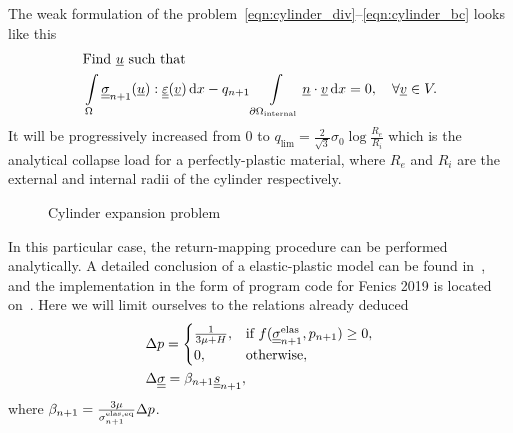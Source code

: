 \documentclass[12pt]{article}
\begin{document}
The weak formulation of the problem~\eqref{eqn:cylinder_div}--\eqref{eqn:cylinder_bc} looks like this
\begin{align}
    & \text{Find } \underline{u} \text{ such that} \label{eqn:cylinder_var_1} \\
    & \int\limits_\Omega\underline{\underline{\sigma}}_{n+1}(\underline{u}) : \underline{\underline{\varepsilon}}(\underline{v}) \, \mathrm{d} x - q_{n+1}\int\limits_{\partial\Omega_\text{internal}}\underline{n} \cdot \underline{v} \, \mathrm{d} x = 0, \quad \forall \underline{v} \in V. \label{eqn:cylinder_var_2}
\end{align}
It will be progressively increased from 0 to $q_\text{lim} = \frac{2}{\sqrt{3}}\sigma_0\log{\frac{R_e}{R_i}}$ which is the analytical collapse load for a perfectly-plastic material, where $R_e$ and $R_i$ are the external and internal radii of the cylinder respectively.

\begin{figure}[H]
    \begin{minipage}[h]{0.5\linewidth}
    \end{minipage}
    \hfill
    \begin{minipage}[h]{0.5\linewidth}
    \end{minipage}
    \caption{Cylinder expansion problem}
    \label{fig:domain}
\end{figure}

In this particular case, the return-mapping procedure can be performed analytically. A detailed conclusion of a elastic-plastic model can be found in~\parencite{bonnet:hal-01083772}, and the implementation in the form of program code for Fenics 2019 is located on~\parencite{bleyer2018numericaltours}. Here we will limit ourselves to the relations already deduced
\begin{align}
    &\Delta p = 
    \begin{cases}
        \frac{1}{3\mu + H}, & \text{if } f(\underline{\underline{\sigma}}^\text{elas}_{n+1}, p_{n+1}) \geq 0,\\
        0, & \text{otherwise},
    \end{cases} \label{eqn:dp_von_mises}\\
    &\Delta\underline{\underline{\sigma}} = \beta_{n+1}\underline{\underline{s}}_{n+1}, \label{eqn:dsigma_von_mises}
\end{align}
where $\beta_{n+1} = \frac{3\mu}{\sigma_{n+1}^\text{elas,eq}}\Delta p$.
\end{document}
